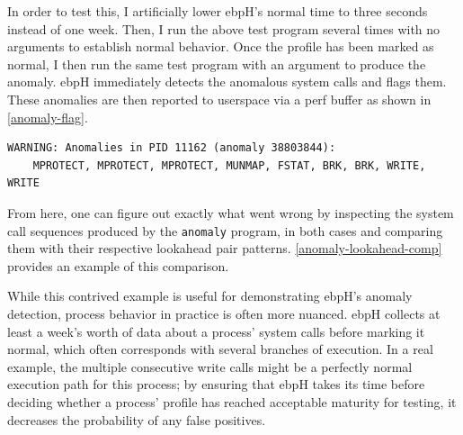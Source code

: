 \documentclass[
  12pt]{findlay}
\newcommand{\passthrough}[1]{#1}
\begin{document}
\protect\enlargethispage*{\baselineskip}


In order to test this, I artificially lower ebpH's normal time to three
seconds instead of one week. Then, I run the above test program several
times with no arguments to establish normal behavior. Once the profile
has been marked as normal, I then run the same test program with an
argument to produce the anomaly. ebpH immediately detects the anomalous
system calls and flags them. These anomalies are then reported to
userspace via a perf buffer as shown in \autoref{anomaly-flag}.

\begin{lstlisting}[label={anomaly-flag}, numbers=none, caption={[The flagged anomaly in the \texttt{anomaly}
binary as shown in the ebpH logs]The flagged anomaly in the \texttt{anomaly}
binary as shown in the ebpH logs. Note that ebpH also logs the offending sequence, reordering it
so that most recent system calls appear on the right.}, language=none]
WARNING: Anomalies in PID 11162 (anomaly 38803844):
    MPROTECT, MPROTECT, MPROTECT, MUNMAP, FSTAT, BRK, BRK, WRITE, WRITE
\end{lstlisting}

From here, one can figure out exactly what went wrong by inspecting the
system call sequences produced by the \passthrough{\lstinline!anomaly!}
program, in both cases and comparing them with their respective
lookahead pair patterns. \autoref{anomaly-lookahead-comp} provides an
example of this comparison.

While this contrived example is useful for demonstrating ebpH's anomaly
detection, process behavior in practice is often more nuanced. ebpH
collects at least a week's worth of data about a process' system calls
before marking it normal, which often corresponds with several branches
of execution. In a real example, the multiple consecutive write calls
might be a perfectly normal execution path for this process; by ensuring
that ebpH takes its time before deciding whether a process' profile has
reached acceptable maturity for testing, it decreases the probability of
any false positives.
\end{document}
